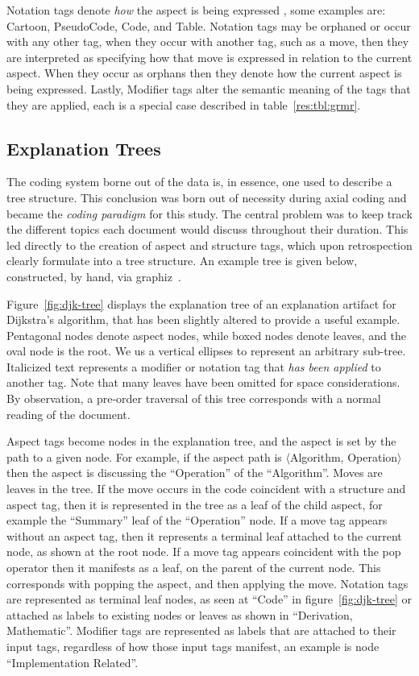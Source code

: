 \documentclass[sigconf]{acmart}
\newcommand{\brackets}[1]{$\langle$\ignorespaces#1\unskip$\rangle$}
\begin{document}
Notation tags denote \emph{how} the aspect is being expressed , some examples
are: Cartoon, PseudoCode, Code, and Table. Notation tags may be orphaned or
occur with any other tag, when they occur with another tag, such as a move, then
they are interpreted as specifying how that move is expressed in relation to the
current aspect. When they occur as orphans then they denote how the current
aspect is being expressed. Lastly, Modifier tags alter the semantic meaning of
the tags that they are applied, each is a special case described in
table~\ref{res:tbl:grmr}.
%

\subsection{Explanation Trees}
\label{sec:res:xopTree}



The coding system borne out of the data is, in essence, one used to describe a
tree structure. This conclusion was born out of necessity during axial coding
and became the \emph{coding paradigm} for this study. The central problem was to
keep track the different topics each document would discuss throughout their
duration. This led directly to the creation of aspect and structure tags, which
upon retrospection clearly formulate into a tree structure. An
example tree is given below, constructed, by hand, via
graphiz~\cite{Ellson2002}.


Figure~\ref{fig:djk-tree} displays the explanation tree of an explanation
artifact for Dijkstra's algorithm, that has been slightly altered to provide a
useful example. Pentagonal nodes denote aspect nodes, while boxed nodes denote
leaves, and the oval node is the root. We us a vertical ellipses to represent an
arbitrary sub-tree. Italicized text represents a modifier or notation tag that
\emph{has been applied} to another tag. Note that many leaves have been omitted
for space considerations. By observation, a pre-order traversal of this tree
corresponds with a normal reading of the document.

Aspect tags become nodes in the explanation tree, and the aspect is set by the
path to a given node. For example, if the aspect path is \brackets{Algorithm,
  Operation} then the aspect is discussing the ``Operation'' of the
``Algorithm''. Moves are leaves in the tree. If the move occurs in the code
coincident with a structure and aspect tag, then it is represented in the tree
as a leaf of the child aspect, for example the ``Summary'' leaf of the
``Operation'' node. If a move tag appears without an aspect tag, then it
represents a terminal leaf attached to the current node, as shown at the root
node. If a move tag appears coincident with the pop operator then it manifests
as a leaf, on the parent of the current node. This corresponds with popping the
aspect, and then applying the move. Notation tags are represented as terminal
leaf nodes, as seen at ``Code'' in figure~\ref{fig:djk-tree} or attached as
labels to existing nodes or leaves as shown in ``Derivation, Mathematic''.
Modifier tags are represented as labels that are attached to their input tags,
regardless of how those input tags manifest, an example is node ``Implementation
Related''.
\end{document}
